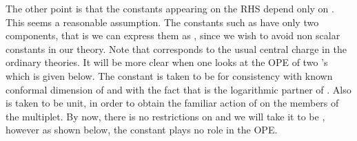 \documentclass[a4paper,11pt]{article}
\begin{document}
 The other point is that the constants appearing on the RHS
depend only on \coordHE{}. This seems a reasonable assumption. The
constants such as \coordHE{} have only two components, that is we
can express them as \coordHE{}, since we
wish to avoid non scalar constants in our theory. Note that \coordHE{}
corresponds to the usual central charge in the ordinary theories.
It will be more clear when one looks at the OPE of two \coordHE{}'s
which is given below. The constant \coordHE{} is taken to be
\coordHE{} for consistency with known conformal
dimension of \coordHE{} and with the fact that \coordHE{} is the
logarithmic partner of \coordHE{}. Also \coordHE{} is taken to be
unit, in order to obtain the familiar action of \coordHE{} on the
members of the multiplet. By now, there is no restrictions on
\coordHE{} and we will take it to be \coordHE{},
however as shown below, the constant \coordHE{} plays no role in the
OPE.
\end{document}
